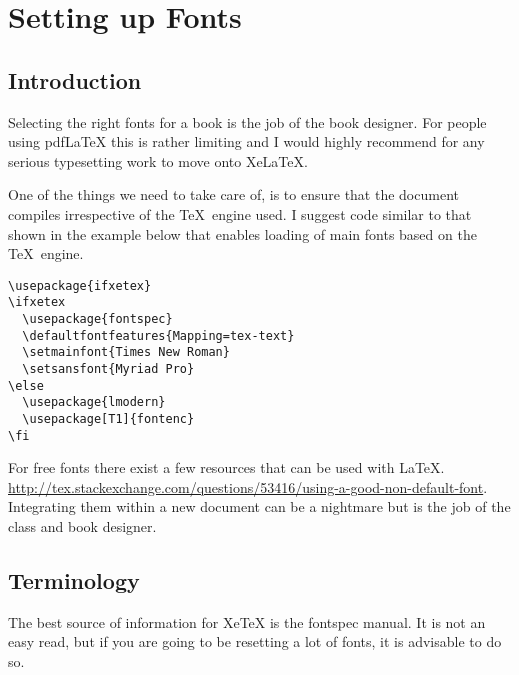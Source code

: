 


\@specialtrue
{}


\chapter{Setting up Fonts}

\section{Introduction}

Selecting the right fonts for a book is the job of the book designer. For people using pdfLaTeX this is rather limiting and I would highly recommend for any serious typesetting work to move onto XeLaTeX.

One of the things we need to take care of, is to ensure that the document compiles irrespective of the \TeX\ engine used. I suggest code similar to that shown in the example below that enables loading of main fonts based on the \TeX\ engine.

\begin{tcolorbox}
\begin{lstlisting}
\usepackage{ifxetex}
\ifxetex
  \usepackage{fontspec}
  \defaultfontfeatures{Mapping=tex-text}
  \setmainfont{Times New Roman}
  \setsansfont{Myriad Pro}
\else
  \usepackage{lmodern}
  \usepackage[T1]{fontenc}
\fi
\end{lstlisting}
\end{tcolorbox}

For free fonts there exist a few resources that can be used with \LaTeX.
\url{http://tex.stackexchange.com/questions/53416/using-a-good-non-default-font}. Integrating them within a new document can be a nightmare but is the job of the class and book designer.

\section{Terminology}

The best source of information for XeTeX is the fontspec manual. It is not an easy read, but if you are going to be resetting a lot of fonts, it is advisable to do so.

